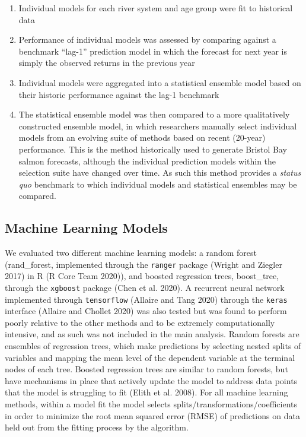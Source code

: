 \documentclass[
]{article}
\begin{document}
\begin{enumerate}
\def\labelenumi{\arabic{enumi}.}
\item
  Individual models for each river system and age group were fit to historical data
\item
  Performance of individual models was assessed by comparing against a benchmark ``lag-1'' prediction model in which the forecast for next year is simply the observed returns in the previous year
\item
  Individual models were aggregated into a statistical ensemble model based on their historic performance against the lag-1 benchmark
\item
  The statistical ensemble model was then compared to a more qualitatively constructed ensemble model, in which researchers manually select individual models from an evolving suite of methods based on recent (20-year) performance. This is the method historically used to generate Bristol Bay salmon forecasts, although the individual prediction models within the selection suite have changed over time. As such this method provides a \emph{status quo} benchmark to which individual models and statistical ensembles may be compared.
\end{enumerate}

\hypertarget{machine-learning-models}{%
\subsection*{Machine Learning Models}\label{machine-learning-models}}

We evaluated two different machine learning models: a random forest (rand\_forest, implemented through the \texttt{ranger} package (Wright and Ziegler 2017) in R (R Core Team 2020)), and boosted regression trees, boost\_tree, through the \texttt{xgboost} package (Chen et al. 2020). A recurrent neural network implemented through \texttt{tensorflow} (Allaire and Tang 2020) through the \texttt{keras} interface (Allaire and Chollet 2020) was also tested but was found to perform poorly relative to the other methods and to be extremely computationally intensive, and as such was not included in the main analysis. Random forests are ensembles of regression trees, which make predictions by selecting nested splits of variables and mapping the mean level of the dependent variable at the terminal nodes of each tree. Boosted regression trees are similar to random forests, but have mechanisms in place that actively update the model to address data points that the model is struggling to fit (Elith et al. 2008). For all machine learning methods, within a model fit the model selects splits/transformations/coefficients in order to minimize the root mean squared error (RMSE) of predictions on data held out from the fitting process by the algorithm.
\end{document}
